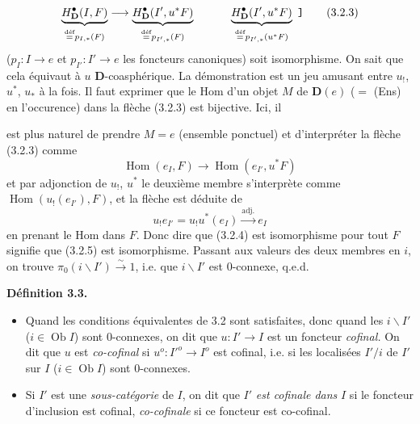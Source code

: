 \documentclass[11pt]{article}
\newcommand{\printedpage}[1]{\marginpar{\footnotesize p.~#1}}
\newcommand{\msp}[1]{\marginpar{\footnotesize [#1]}}
\newcommand{\Hom}{\operatorname{Hom}}
\newcommand{\Ob}{\operatorname{Ob}}
\newcommand{\def}{\overset{\text{déf}}{=}}
\newcommand{\pl}{{}}
\newcommand{\bs}{\backslash}
\begin{document}
\[
\underbrace{H^{\bullet}_{\mathbf{D}}(I,F)}_{\def p_{I,*}(F)} \longrightarrow \underbrace{H^{\bullet}_{\mathbf{D}}(I',u^*F)}_{\def p_{I',*}(F)} \qquad \text{\pl}\quad \underbrace{H^{\bullet}_{\mathbf{D}}(I',u^*F)}_{\def p_{I',*}(u^*F)}\ \text{\texttt{]}} \tag*{(3.2.3)}
\]
($p_I : I \longrightarrow e$ et $p_{I'} : I' \longrightarrow e$ les foncteurs canoniques) soit isomorphisme. On sait que cela équivaut à $u$ $\mathbf{D}$-coasphérique. La démonstration est un jeu amusant entre $u_!$, $u^*$, $u_*$ à la fois. Il faut exprimer que le Hom d'un objet $M$ de $\mathbf{D}(e)$ ($=$ (Ens) en l'occurence) dans la flèche (3.2.3) est bijective. Ici, il %

\printedpage{29}

\msp{page 45}
est plus naturel de prendre $M = e$ (ensemble ponctuel) et d'interpréter la flèche (3.2.3) comme
\[
\Hom(e_I, F) \longrightarrow \Hom(e_{I'}, u^*F)
\tag*{(3.2.4)}
\]
et par adjonction de $u_!$, $u^*$ le deuxième membre s'interprète comme $\Hom(u_!(e_{I'}), F)$, et la flèche est déduite de
\[
u_!e_{I'} = u_!u^*(e_I) \xrightarrow{\text{adj.}} e_I
\tag*{(3.2.5)}
\]
en prenant le Hom dans $F$. Donc dire que (3.2.4) est isomorphisme pour tout $F$ signifie que (3.2.5) est isomorphisme. Passant aux valeurs des deux membres en $i$, on trouve $\pi_0(i\bs I') \xrightarrow{\sim} 1$, i.e. que $i\bs I'$ est 0-connexe, q.e.d.

\noindent\textbf{Définition 3.3.}
\begin{itemize}[label={}]
\item[a)] Quand les conditions équivalentes de 3.2 sont satisfaites, donc quand les $i\bs I'$ ($i \in \Ob I$) sont 0-connexes, on dit que $u : I' \longrightarrow I$ est un foncteur \textit{cofinal.} On dit que $u$ est \textit{co-cofinal} si $u^o : I'^o \longrightarrow I^o$ est cofinal, i.e. si les localisées $I'/i$ de $I'$ sur $I$ ($i \in \Ob I$) sont 0-connexes.
\item[b)] Si $I'$ est une \textit{sous-catégorie} de $I$, on dit que $I'$ \textit{est cofinale dans} $I$ si le foncteur d'inclusion est cofinal, \textit{co-cofinale} si ce foncteur est co-cofinal.
\end{itemize}
\end{document}
